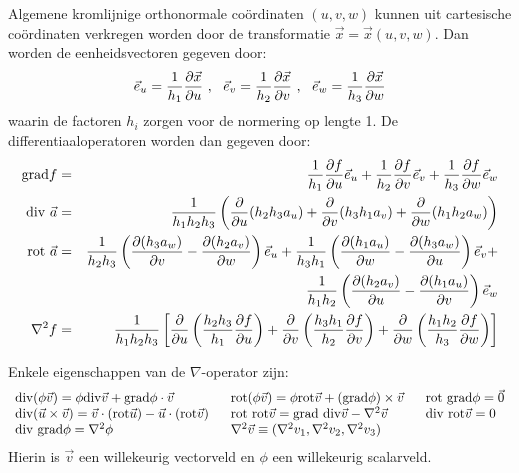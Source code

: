Algemene kromlijnige orthonormale co\"ordinaten $(u,v,w)$ kunnen uit
cartesische co\"ordinaten verkregen worden door de transformatie
$\vec{x}=\vec{x}(u,v,w)$. Dan worden de eenheidsvectoren gegeven door:
\[
\vec{e}_{u}=\frac{1}{h_1}\frac{\partial \vec{x}}{\partial u}~,~~ \vec{e}_{v}=\frac{1}{h_2}\frac{\partial \vec{x}}{\partial v}~,~~
\vec{e}_{w}=\frac{1}{h_3}\frac{\partial \vec{x}}{\partial w}
\]
waarin de factoren $h_i$ zorgen voor de normering op lengte 1. De
differentiaaloperatoren worden dan gegeven door:
\begin{eqnarray*}
{\rm grad}f      &=&\frac{1}{h_1}\frac{\partial f}{\partial u}\vec{e}_{u}+\frac{1}{h_2}\frac{\partial f}{\partial v}\vec{e}_{v}+\frac{1}{h_3}\frac{\partial f}{\partial w}\vec{e}_{w}\\
{\rm div}~\vec{a}&=&\frac{1}{h_1h_2h_3}\left(\frac{\partial }{\partial u}(h_2h_3a_u)+\frac{\partial }{\partial v}(h_3h_1a_v)+\frac{\partial }{\partial w}(h_1h_2a_w)\right)\\
{\rm rot}~\vec{a}&=&\frac{1}{h_2h_3}\left(\frac{\partial (h_3a_w)}{\partial v}-\frac{\partial (h_2a_v)}{\partial w}\right)\vec{e}_{u}+
                    \frac{1}{h_3h_1}\left(\frac{\partial (h_1a_u)}{\partial w}-\frac{\partial (h_3a_w)}{\partial u}\right)\vec{e}_{v}+\\
                  &&\frac{1}{h_1h_2}\left(\frac{\partial (h_2a_v)}{\partial u}-\frac{\partial (h_1a_u)}{\partial v}\right)\vec{e}_{w}\\
\nabla^2 f       &=&\frac{1}{h_1h_2h_3}\left[\frac{\partial }{\partial u}\left(\frac{h_2h_3}{h_1}\frac{\partial f}{\partial u}\right)+
                    \frac{\partial }{\partial v}\left(\frac{h_3h_1}{h_2}\frac{\partial f}{\partial v}\right)+
                    \frac{\partial }{\partial w}\left(\frac{h_1h_2}{h_3}\frac{\partial f}{\partial w}\right)\right]
\end{eqnarray*}

Enkele eigenschappen van de $\nabla$-operator zijn:
\[
\begin{array}{l@{~~~~~}l@{~~~~~}l}
{\rm div}(\phi\vec{v})=\phi{\rm div}\vec{v}+{\rm grad}\phi\cdot\vec{v}&
{\rm rot}(\phi\vec{v})=\phi{\rm rot}\vec{v}+({\rm grad}\phi)\times\vec{v}&{\rm rot~grad}\phi=\vec{0}\\
{\rm div}(\vec{u}\times\vec{v})=\vec{v}\cdot({\rm rot}\vec{u})-\vec{u}\cdot({\rm rot}\vec{v})&
{\rm rot~rot}\vec{v}={\rm grad~div}\vec{v}-\nabla^2\vec{v}&{\rm div~rot}\vec{v}=0\\
{\rm div~grad}\phi=\nabla^2\phi&\nabla^2\vec{v}\equiv(\nabla^2v_1,\nabla^2v_2,\nabla^2v_3)
\end{array}
\]
Hierin  is $\vec{v}$ een willekeurig vectorveld en $\phi$ een willekeurig
scalarveld.

